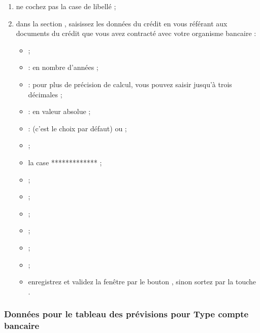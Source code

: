 \begin{enumerate}
	\item ne cochez pas la case de libellé  ; %
	\item dans la section , saisissez les données du crédit en vous référant aux documents du crédit que vous avez contracté avec votre organisme bancaire :
		\begin{itemize}
			 \item {} ; 
			 \item {} : en nombre d'années ;
			 \item {} : pour plus de précision de calcul, vous pouvez saisir jusqu'à trois décimales ;
			 \item {} : en valeur absolue ;
			 \item {} :  (c'est le choix par défaut) ou  ;
			 \item {} ;
			 \item la case ***** ;
			 \item {} ;
			 \item {} ;
			 \item {} ;
			 \item {} ;
			 \item {} ;
			 \item {} ;
			 
			 		 
			 \item enregistrez et validez la fenêtre par le bouton , sinon sortez par la touche .
		\end{itemize}
\end{enumerate}


\subsubsection{Données pour le tableau des prévisions pour Type compte bancaire\label{setup-budget-data-bank}}

